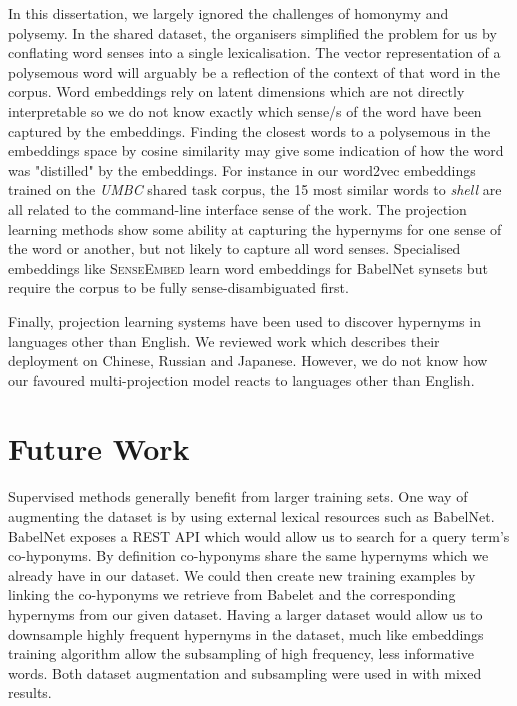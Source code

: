 In this dissertation, we largely ignored the challenges of homonymy and polysemy. In the shared dataset, the organisers simplified the problem for us by conflating word senses into a single lexicalisation.   The vector representation of a polysemous word will arguably be a reflection of the context of that word in the corpus.  Word embeddings rely on latent dimensions which are not directly interpretable so we do not know exactly which sense/s of the word have been captured by the embeddings.  Finding the closest words to a polysemous in the embeddings space by cosine similarity may give some indication of how the word was "distilled" by the embeddings.  For instance in our word2vec embeddings trained on the \textit{UMBC} shared task corpus, the 15 most similar words to \textit{shell} are all related to the command-line interface sense of the work.  The projection learning methods show some ability at capturing the hypernyms for one sense of the word or another, but not likely to capture all word senses.  Specialised embeddings like \textsc{SenseEmbed} \citep{iacobacci2015sensembed} learn word embeddings for BabelNet \citep{navigli2012babelnet} synsets but require the corpus to be fully sense-disambiguated first.

Finally, projection learning systems have been used to discover hypernyms in languages other than English.  We reviewed work which describes their deployment on Chinese, Russian and Japanese.  However, we do not know how our favoured multi-projection model reacts to languages other than English.  

\section{Future Work}
Supervised methods generally benefit from larger training sets.  One way of augmenting the dataset is by using external lexical resources such as BabelNet.  BabelNet exposes a REST API which would allow us to search for a query term's co-hyponyms.  By definition co-hyponyms share the same hypernyms which we already have in our dataset.  We could then create new training examples by linking the co-hyponyms we retrieve from Babelet and the corresponding hypernyms from our given dataset.  Having a larger dataset would allow us to downsample highly frequent hypernyms in the dataset, much like embeddings training algorithm allow the subsampling of high frequency, less informative words.  Both dataset augmentation and subsampling were used in \cite{bernier2018crim} with mixed results.

